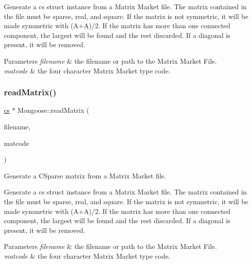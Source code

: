 Generate a cs struct instance from a Matrix Market file. The matrix contained in the file must be sparse, real, and square. If the matrix is not symmetric, it will be made symmetric with (A+A\textquotesingle{})/2. If the matrix has more than one connected component, the largest will be found and the rest discarded. If a diagonal is present, it will be removed.


\begin{DoxyParams}{Parameters}
{\em filename} & the filename or path to the Matrix Market File. \\
\hline
{\em matcode} & the four character Matrix Market type code. \\
\hline
\end{DoxyParams}
\hypertarget{namespace_mongoose_a008f29c7dc05d2436f6e82e117d80ab8}{}\label{namespace_mongoose_a008f29c7dc05d2436f6e82e117d80ab8} 
\subsubsection{\texorpdfstring{read\+Matrix()}{readMatrix()}\hspace{0.1cm}{\footnotesize\ttfamily [2/2]}}
{\footnotesize\ttfamily \hyperlink{struct_mongoose_1_1cs__sparse}{cs} $\ast$ Mongoose\+::read\+Matrix (\begin{DoxyParamCaption}\item[{const char $\ast$}]{filename,  }\item[{M\+M\+\_\+typecode \&}]{matcode }\end{DoxyParamCaption})}



Generate a C\+Sparse matrix from a Matrix Market file. 

Generate a cs struct instance from a Matrix Market file. The matrix contained in the file must be sparse, real, and square. If the matrix is not symmetric, it will be made symmetric with (A+A\textquotesingle{})/2. If the matrix has more than one connected component, the largest will be found and the rest discarded. If a diagonal is present, it will be removed.


\begin{DoxyParams}{Parameters}
{\em filename} & the filename or path to the Matrix Market File. \\
\hline
{\em matcode} & the four character Matrix Market type code. \\
\hline
\end{DoxyParams}
